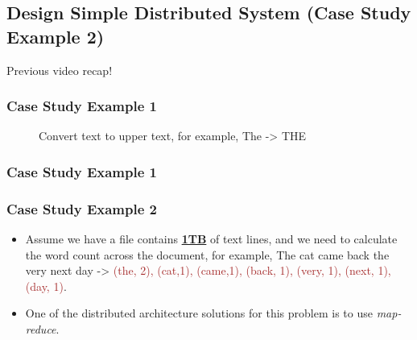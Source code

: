 \subsection{Design Simple Distributed System (Case Study Example 2)}

\begin{frame}[c]{ }
	\centering     
	
	\textcolor{offgreen}{ \large Previous video recap!}
\end{frame}

\begin{frame}[plain,c]
	\frametitle{Case Study Example 1}
	\begin{figure}
		\centering
		
		\caption{Convert text to upper text, for example, The -> THE } \label{fig:DS3}
	\end{figure}
	
\end{frame}
\begin{frame}[plain,c]
	\frametitle{Case Study Example 1}
	\begin{figure}
		\centering
		
	\end{figure}
	
\end{frame}
\begin{frame}
	\frametitle{Case Study Example 2}
	\begin{itemize}  [<+->]
		\item Assume we have a file contains \textbf{\underline{1TB}} of text lines, and we need to calculate the word count across the document, for example, \textcolor{offyellow}{The cat came back the very next day} -> \textcolor{brown}{(the, 2), (cat,1), (came,1), (back, 1), (very, 1), (next, 1), (day, 1)}.

		\item One of the distributed architecture solutions for this problem is to use \textcolor{offyellow}{\textit{map-reduce}}.
	\end{itemize}
\end{frame}


